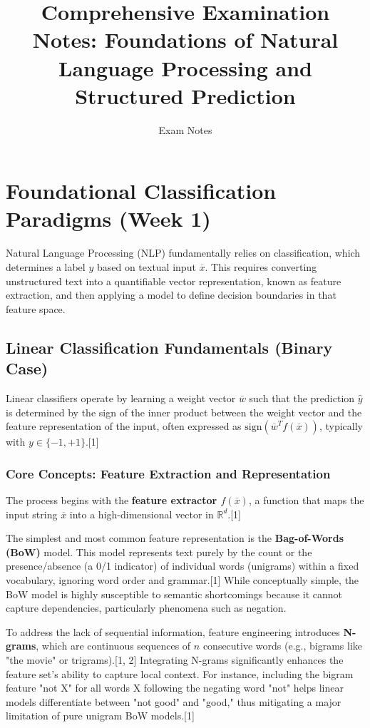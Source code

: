 \documentclass{article}
\title{Comprehensive Examination Notes: Foundations of Natural Language Processing and Structured Prediction}
\author{Exam Notes}
\date{}
\begin{document}
\maketitle

\section{Foundational Classification Paradigms (Week 1)}

Natural Language Processing (NLP) fundamentally relies on classification, which determines a label $y$ based on textual input $\overline{x}$. This requires converting unstructured text into a quantifiable vector representation, known as feature extraction, and then applying a model to define decision boundaries in that feature space.

\subsection{Linear Classification Fundamentals (Binary Case)}

Linear classifiers operate by learning a weight vector $\overline{w}$ such that the prediction $\hat{y}$ is determined by the sign of the inner product between the weight vector and the feature representation of the input, often expressed as $\text{sign}(\overline{w}^{T}f(\overline{x}))$, typically with $y \in \{-1, +1\}$.[1]

\subsubsection{Core Concepts: Feature Extraction and Representation}

The process begins with the \textbf{feature extractor $f(\overline{x})$}, a function that maps the input string $\overline{x}$ into a high-dimensional vector in $\mathbb{R}^d$.[1]

The simplest and most common feature representation is the \textbf{Bag-of-Words (BoW)} model. This model represents text purely by the count or the presence/absence (a 0/1 indicator) of individual words (unigrams) within a fixed vocabulary, ignoring word order and grammar.[1] While conceptually simple, the BoW model is highly susceptible to semantic shortcomings because it cannot capture dependencies, particularly phenomena such as negation.

To address the lack of sequential information, feature engineering introduces \textbf{N-grams}, which are continuous sequences of $n$ consecutive words (e.g., bigrams like "the movie" or trigrams).[1, 2] Integrating N-grams significantly enhances the feature set's ability to capture local context. For instance, including the bigram feature "not X" for all words X following the negating word "not" helps linear models differentiate between "not good" and "good," thus mitigating a major limitation of pure unigram BoW models.[1]
\end{document}
